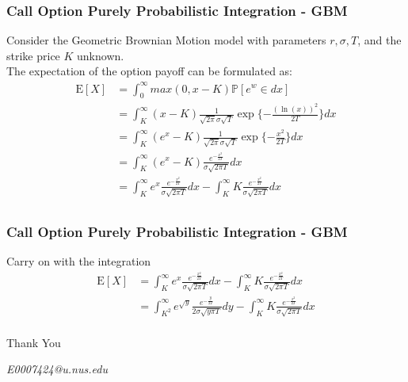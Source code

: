 \documentclass{beamer}
\begin{document}
\begin{frame}
\frametitle{Call Option Purely Probabilistic Integration - GBM}
Consider the Geometric Brownian Motion model with parameters $r, \sigma, T$, and the strike price $K$ unknown.\\
The expectation of the option payoff can be formulated as:
\begin{equation*}
\begin{split}
\mathrm{E}[X] 
&= \int_{0}^{\infty} max(0, x-K) \mathbb{P}[e^{w} \in dx] \\
&= \int_{K}^{\infty} (x-K) \frac{1}{\sqrt{2\pi}\sigma\sqrt{T}} \exp\{-\frac{(\ln(x))^{2}}{2T}\} dx\\
&= \int_{K}^{\infty} (e^{x}-K) \frac{1}{\sqrt{2\pi}\sigma\sqrt{T}} \exp\{-\frac{x^{2}}{2T}\} dx\\
&= \int_{K}^{\infty} (e^{x}-K) \frac{e^{-\frac{x^{2}}{2T}}}{\sigma\sqrt{2\pi T}} dx\\
&= \int_{K}^{\infty} e^{x} \frac{e^{-\frac{x^{2}}{2T}}}{\sigma\sqrt{2\pi T}} dx - \int_{K}^{\infty} K \frac{e^{-\frac{x^{2}}{2T}}}{\sigma\sqrt{2\pi T}} dx\\
\end{split}
\end{equation*}
\end{frame}

\begin{frame}
\frametitle{Call Option Purely Probabilistic Integration - GBM}
Carry on with the integration
\begin{equation*}
\begin{split}
\mathrm{E}[X] 
&= \int_{K}^{\infty} e^{x} \frac{e^{-\frac{x^{2}}{2T}}}{\sigma\sqrt{2\pi T}} dx - \int_{K}^{\infty} K \frac{e^{-\frac{x^{2}}{2T}}}{\sigma\sqrt{2\pi T}} dx\\
&= \int_{K^{2}}^{\infty} e^{\sqrt{y}} \frac{e^{-\frac{y}{2T}}}{2\sigma\sqrt{y\pi{T}}} dy - \int_{K}^{\infty} K \frac{e^{-\frac{x^{2}}{2T}}}{\sigma\sqrt{2\pi T}} dx\\
\end{split}
\end{equation*}
\end{frame}

\begin{frame}
\Huge{\centerline{Thank You}}
\begin{center}
\begin{normalsize}
\emph{E0007424@u.nus.edu}
\end{normalsize}
\end{center}
\end{frame}

\end{document}
